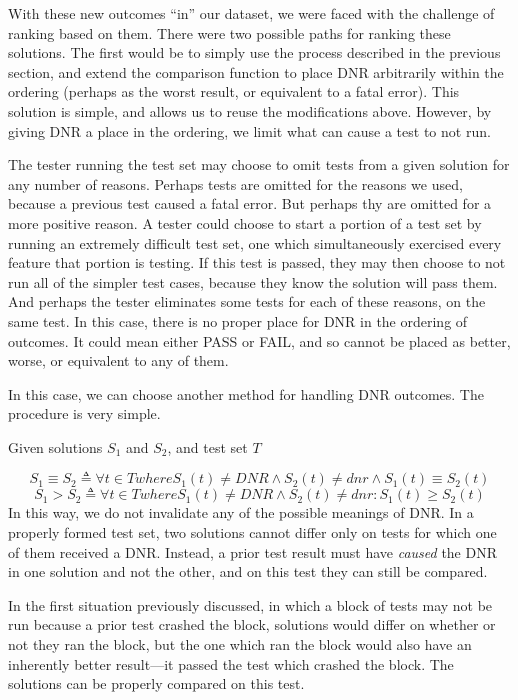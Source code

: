 \documentclass[11pt,twoside]{article}
\newcommand\dnr{\mathit{DNR}}
\newcommand\defined{\triangleq}
\begin{document}
With these new outcomes ``in'' our dataset, we were faced with the challenge of ranking based on them. There were two possible paths for ranking these solutions. The first would be to simply use the process described in the previous section, and extend the comparison function to place DNR arbitrarily within the ordering (perhaps as the worst result, or equivalent to a fatal error). This solution is simple, and allows us to reuse the modifications above. However, by giving DNR a place in the ordering, we limit what can cause a test to not run.

The tester running the test set may choose to omit tests from a given solution for any number of reasons. Perhaps tests are omitted for the reasons we used, because a previous test caused a fatal error. But perhaps thy are omitted for a more positive reason. A tester could choose to start a portion of a test set by running an extremely difficult test set, one which simultaneously exercised every feature that portion is testing. If this test is passed, they may then choose to not run all of the simpler test cases, because they know the solution will pass them. And perhaps the tester eliminates some tests for each of these reasons, on the same test. In this case, there is no proper place for DNR in the ordering of outcomes. It could mean either PASS or FAIL, and so cannot be placed as better, worse, or equivalent to any of them.

In this case, we can choose another method for handling DNR outcomes. The procedure is very simple.

\centerline{Given solutions $S_1$ and $S_2$, and test set $T$}
$$S_1 \equiv S_2 \defined \forall t \in T where S_1(t) \neq \dnr \wedge S_2(t) \neq dnr \wedge S_1(t) \equiv S_2(t)$$
$$S_1 > S_2 \defined \forall t \in T where S_1(t) \neq \dnr \wedge S_2(t) \neq dnr : S_1(t) \geq S_2(t)$$
In this way, we do not invalidate any of the possible meanings of DNR. In a properly formed test set, two solutions cannot differ only on tests for which one of them received a DNR. Instead, a prior test result must have \emph{caused} the DNR in one solution and not the other, and on this test they can still be compared. 

In the first situation previously discussed, in which a block of tests may not be run because a prior test crashed the block, solutions would differ on whether or not they ran the block, but the one which ran the block would also have an inherently better result---it passed the test which crashed the block. The solutions can be properly compared on this test.
\end{document}
